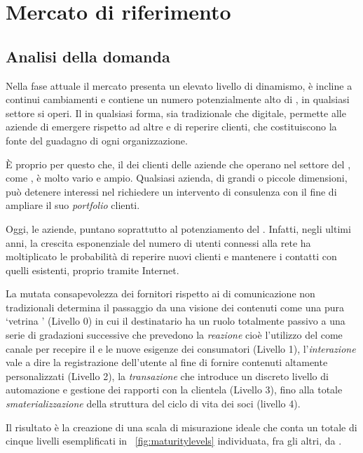 \chapter{Mercato di riferimento}
\section{Analisi della domanda}\label{sec:domanda}

Nella fase attuale il mercato presenta un elevato livello di dinamismo, è incline a continui cambiamenti e contiene un numero potenzialmente alto di , in qualsiasi settore si operi. Il \mktg in qualsiasi forma, sia tradizionale che digitale, permette alle aziende di emergere rispetto ad altre e di reperire clienti, che costituiscono la fonte del guadagno di ogni organizzazione.

È  proprio per questo che, il  dei clienti delle aziende che operano nel settore del \mktg, come \customer, è molto vario e ampio. Qualsiasi azienda, di grandi o piccole dimensioni, può detenere interessi nel richiedere un intervento di consulenza \mktg con il fine di ampliare il suo \textit{portfolio} clienti.

Oggi, le aziende, puntano soprattutto al potenziamento del \mktg {}. Infatti, negli ultimi anni, la crescita esponenziale del numero di utenti connessi alla rete ha moltiplicato le probabilità di reperire nuovi clienti e mantenere i contatti con quelli esistenti, proprio tramite Internet.

La mutata consapevolezza dei fornitori rispetto ai  di comunicazione non tradizionali determina il passaggio da una visione dei contenuti  come una pura `vetrina ' (Livello 0) in cui il destinatario ha un ruolo totalmente passivo a una serie di gradazioni successive che prevedono la \emph{reazione} cioè l'utilizzo del  come canale per recepire il  e le nuove esigenze dei consumatori (Livello 1), l'\emph{interazione} vale a dire la registrazione dell'utente al fine di fornire contenuti altamente personalizzati (Livello 2), la \emph{transazione} che introduce un discreto livello di automazione e gestione dei rapporti con la clientela (Livello 3), fino alla totale \emph{smaterializzazione} della struttura del ciclo di vita dei soci (livello 4).

Il risultato è la creazione di una scala di misurazione ideale che conta un totale di cinque livelli esemplificati in \figurename~\ref{fig:maturitylevels} individuata, fra gli altri, da \cite[\textit{pag. 90 e succ.}]{gerrard:ebusiness}.

